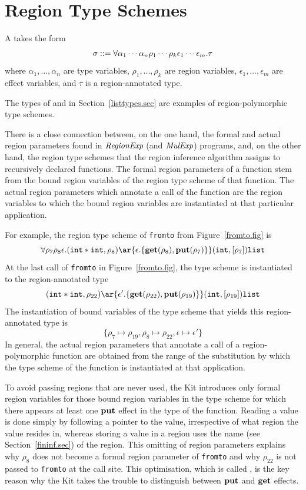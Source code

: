 \documentclass[12pt]{book}
\begin{document}
\section{Region Type Schemes}
\label{regtych.sec}
A  takes the form
$$\sigma::=\forall\alpha_1\cdots\alpha_n\rho_1\cdots\rho_k\epsilon_1\cdots\epsilon_m.\tau$$
where $\alpha_1,\ldots,\alpha_n$ are type variables,
$\rho_1,\ldots,\rho_k$ are region variables,
$\epsilon_1,\ldots,\epsilon_m$ are effect variables,
and $\tau$ is a region-annotated type.

The types of  and \boxml{::} in Section~\ref{listtypes.sec} are examples of 
region-polymorphic type schemes. 

There is a close connection between, on the one hand, the formal and
actual region parameters found in $\hbox{\it RegionExp}$
(and $\hbox{\it MulExp}$) programs, and, on the other hand, the region type schemes that the region inference algorithm
assigns to recursively declared functions. The formal region
parameters of a function stem from the bound region variables of the
region type scheme of that function.  The actual region parameters which
annotate a call of the function are the region variables to which the bound
region variables are instantiated at that particular application.

For example, the region type scheme of {\tt fromto} from Figure~\ref{fromto.fig} is
$$\forall\rho_7\rho_8\epsilon.(\boxml{int} \ast \boxml{int},\rho_8)\ar{\epsilon.\{
\Get(\rho_8),\Put(\rho_7)\}} (\boxml{int},[\rho_7])\boxml{list}$$
At the last call of {\tt fromto} in Figure~\ref{fromto.fig},
the type scheme is instantiated to the region-annotated type
$$(\boxml{int} \ast \boxml{int},\rho_{22})\ar{\epsilon'.\{
\Get(\rho_{22}),\Put(\rho_{19})\}} (\boxml{int},[\rho_{19}])\boxml{list}$$
The instantiation of bound variables of the type scheme that yields this region-annotated type is
$$\{\rho_7\mapsto\rho_{19}, \rho_8\mapsto\rho_{22}, \epsilon\mapsto\epsilon'\}$$
In general, the actual region parameters that annotate a call of a region-polymorphic function are obtained from
the range of the substitution by which the type scheme of the function is  instantiated at that
application.

To avoid passing regions that are never used, the Kit introduces only 
formal region variables for those bound region variables in the type scheme
for which there appears at least one $\mathop{\bf put}\nolimits$ effect in the type of the function.
Reading a value is done simply by following a pointer to the value, irrespective
of what region the value resides in, whereas storing a value in a region uses the
name (see Section~\ref{fininf.sec}) of the region.
This omitting of region parameters explains why $\rho_8$ does not become a formal region parameter of {\tt fromto} and why
$\rho_{22}$ is not passed to {\tt fromto} at the call site. This optimisation,
which is called , is
the key reason why the Kit takes the trouble to distinguish
between $\mathop{\bf put}\nolimits$ and $\mathop{\bf get}\nolimits$ effects\label{bother-to-distinguish-get-n-put}.
\end{document}

